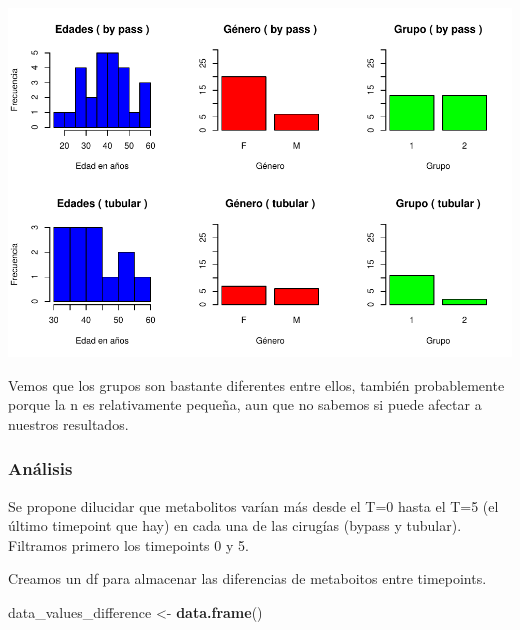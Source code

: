 \documentclass[
]{article}
\newenvironment{Shaded}{\begin{snugshade}}{\end{snugshade}}
\newcommand{\FunctionTok}[1]{\textcolor[rgb]{0.13,0.29,0.53}{\textbf{#1}}}
\newcommand{\NormalTok}[1]{#1}
\newcommand{\OtherTok}[1]{\textcolor[rgb]{0.56,0.35,0.01}{#1}}
\newcommand{\SpecialCharTok}[1]{\textcolor[rgb]{0.81,0.36,0.00}{\textbf{#1}}}
\newcommand{\StringTok}[1]{\textcolor[rgb]{0.31,0.60,0.02}{#1}}
\begin{document}
\includegraphics{Informe-PEC1_files/figure-latex/unnamed-chunk-28-1.pdf}

Vemos que los grupos son bastante diferentes entre ellos, también
probablemente porque la n es relativamente pequeña, aun que no sabemos
si puede afectar a nuestros resultados.

\subsubsection{Análisis}\label{anuxe1lisis}

Se propone dilucidar que metabolitos varían más desde el T=0 hasta el
T=5 (el último timepoint que hay) en cada una de las cirugías (bypass y
tubular). Filtramos primero los timepoints 0 y 5.

\begin{Shaded}
\end{Shaded}

Creamos un df para almacenar las diferencias de metaboitos entre
timepoints.

\begin{Shaded}
\begin{Highlighting}[]
\NormalTok{data\_values\_difference }\OtherTok{\textless{}{-}} \FunctionTok{data.frame}\NormalTok{()}
\end{Highlighting}
\end{Shaded}
\end{document}
